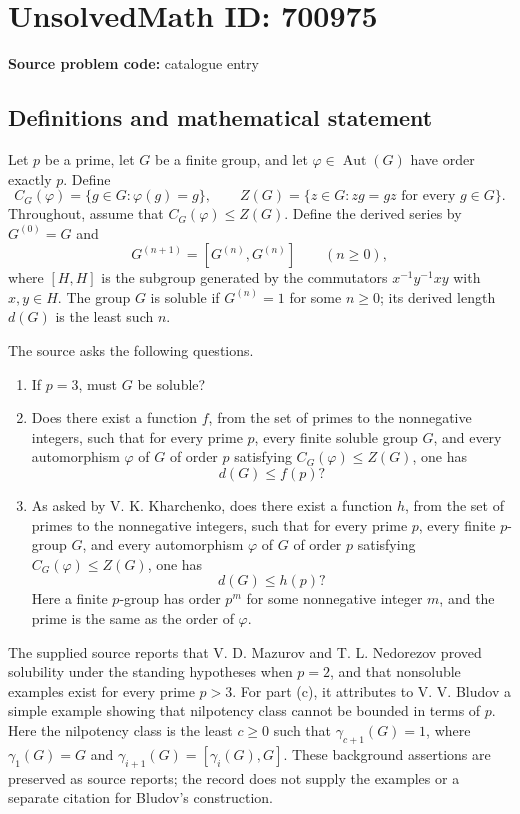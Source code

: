 \documentclass[11pt]{article}
\begin{document}
\section*{UnsolvedMath ID: 700975}
\textbf{Source problem code:} catalogue entry
\subsection{Definitions and mathematical statement}
Let \(p\) be a prime, let \(G\) be a finite group, and let \(\varphi\in\operatorname{Aut}(G)\) have order exactly \(p\). Define
\[
C_G(\varphi)=\{g\in G:\varphi(g)=g\},\qquad
Z(G)=\{z\in G:zg=gz\text{ for every }g\in G\}.
\]
Throughout, assume that \(C_G(\varphi)\leq Z(G)\). Define the derived series by \(G^{(0)}=G\) and
\[
G^{(n+1)}=[G^{(n)},G^{(n)}]\qquad(n\geq0),
\]
where \([H,H]\) is the subgroup generated by the commutators \(x^{-1}y^{-1}xy\) with \(x,y\in H\). The group \(G\) is soluble if \(G^{(n)}=1\) for some \(n\geq0\); its derived length \(d(G)\) is the least such \(n\).

The source asks the following questions.
\begin{enumerate}
\item[(a)] If \(p=3\), must \(G\) be soluble?
\item[(b)] Does there exist a function \(f\), from the set of primes to the nonnegative integers, such that for every prime \(p\), every finite soluble group \(G\), and every automorphism \(\varphi\) of \(G\) of order \(p\) satisfying \(C_G(\varphi)\leq Z(G)\), one has
\[
d(G)\leq f(p)?
\]
\item[(c)] As asked by V. K. Kharchenko, does there exist a function \(h\), from the set of primes to the nonnegative integers, such that for every prime \(p\), every finite \(p\)-group \(G\), and every automorphism \(\varphi\) of \(G\) of order \(p\) satisfying \(C_G(\varphi)\leq Z(G)\), one has
\[
d(G)\leq h(p)?
\]
Here a finite \(p\)-group has order \(p^m\) for some nonnegative integer \(m\), and the prime is the same as the order of \(\varphi\).
\end{enumerate}

The supplied source reports that V. D. Mazurov and T. L. Nedorezov proved solubility under the standing hypotheses when \(p=2\), and that nonsoluble examples exist for every prime \(p>3\). For part (c), it attributes to V. V. Bludov a simple example showing that nilpotency class cannot be bounded in terms of \(p\). Here the nilpotency class is the least \(c\geq0\) such that \(\gamma_{c+1}(G)=1\), where \(\gamma_1(G)=G\) and \(\gamma_{i+1}(G)=[\gamma_i(G),G]\). These background assertions are preserved as source reports; the record does not supply the examples or a separate citation for Bludov's construction.
\end{document}
